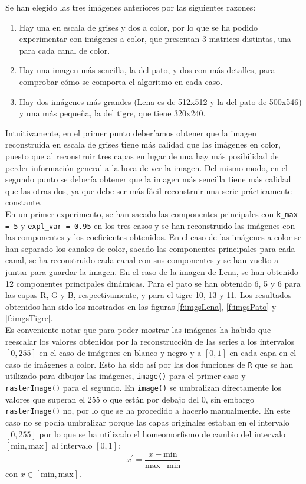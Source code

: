 Se han elegido las tres imágenes anteriores por las siguientes razones:
\begin{enumerate}
\item Hay una en escala de grises y dos a color, por lo que se ha podido experimentar con imágenes a color, que presentan 3 matrices distintas, una para cada canal de color.
\item Hay una imagen más sencilla, la del pato, y dos con más detalles, para comprobar cómo se comporta el algoritmo en cada caso.
\item Hay dos imágenes más grandes (Lena es de 512x512 y la del pato de 500x546) y una más pequeña, la del tigre, que tiene 320x240.
\end{enumerate}

Intuitivamente, en el primer punto deberíamos obtener que la imagen reconstruida en escala de grises tiene más calidad que las imágenes en color, puesto que al reconstruir tres capas en lugar de una hay más posibilidad de perder información general a la hora de ver la imagen. Del mismo modo, en el segundo punto se debería obtener que la imagen más sencilla tiene más calidad que las otras dos, ya que debe ser más fácil reconstruir una serie prácticamente constante.\\ %

En un primer experimento, se han sacado las componentes principales con \texttt{k\_max = 5} y \texttt{expl\_var = 0.95} en los tres casos y se han reconstruido las imágenes con las componentes y los coeficientes obtenidos. En el caso de las imágenes a color se han separado los canales de color, sacado las componentes principales para cada canal, se ha reconstruido cada canal con sus componentes y se han vuelto a juntar para guardar la imagen. En el caso de la imagen de Lena, se han obtenido 12 componentes principales dinámicas. Para el pato se han obtenido 6, 5 y 6 para las capas R, G y B, respectivamente, y para el tigre 10, 13 y 11. Los resultados obtenidos han sido los mostrados en las figuras \ref{f:imgsLena}, \ref{f:imgsPato} y \ref{f:imgsTigre}.\\

Es conveniente notar que para poder mostrar las imágenes ha habido que reescalar los valores obtenidos por la reconstrucción de las series a los intervalos $[0,255]$ en el caso de imágenes en blanco y negro y a $[0,1]$ en cada capa en el caso de imágenes a color. Esto ha sido así por las dos funciones de \texttt{R} que se han utilizado para dibujar las imágenes, \texttt{image()} para el primer caso y \texttt{rasterImage()} para el segundo. En \texttt{image()} se umbralizan directamente los valores que superan el 255 o que están por debajo del 0, sin embargo \texttt{rasterImage()} no, por lo que se ha procedido a hacerlo manualmente. En este caso no se podía umbralizar porque las capas originales estaban en el intervalo $[0,255]$ por lo que se ha utilizado el homeomorfismo de cambio del intervalo $[\text{min},\text{max}]$ al intervalo $[0,1]$:
\[	x^{'} = \frac{x - \text{min}}{\text{max}-\text{min}} 	\]
con $x \in [\text{min},\text{max}]$.

